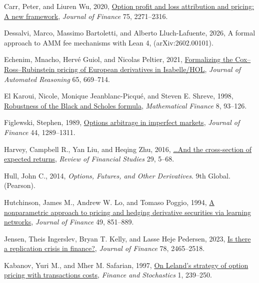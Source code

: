 \documentclass[
  11pt,
  letterpaper,
  DIV=12,
  numbers=noendperiod]{scrartcl}
\newlength{\cslhangindent}
\newenvironment{CSLReferences}[2] %
 {\begin{list}{}{%
  \setlength{\itemindent}{0pt}
  \setlength{\leftmargin}{0pt}
  \setlength{\parsep}{0pt}
  \ifodd #1
   \setlength{\leftmargin}{\cslhangindent}
   \setlength{\itemindent}{-1\cslhangindent}
  \fi
  \setlength{\itemsep}{#2\baselineskip}}}
 {\end{list}}
\numberwithin{equation}{section}
\numberwithin{figure}{section}
\numberwithin{table}{section}
\begin{document}
\begin{CSLReferences}{0}{1}
Carr, Peter, and Liuren Wu, 2020,
\href{https://doi.org/10.1111/jofi.12894}{Option profit and loss
attribution and pricing: A new framework}, \emph{Journal of Finance} 75,
2271--2316.

Dessalvi, Marco, Massimo Bartoletti, and Alberto Lluch-Lafuente, 2026, A
formal approach to {AMM} fee mechanisms with {Lean} 4,
(arXiv:2602.00101).

Echenim, Mnacho, Hervé Guiol, and Nicolas Peltier, 2021,
\href{https://doi.org/10.1007/s10817-019-09528-w}{Formalizing the
{Cox--Ross--Rubinstein} pricing of {European} derivatives in
{Isabelle/HOL}}, \emph{Journal of Automated Reasoning} 65, 669--714.

El Karoui, Nicole, Monique Jeanblanc-Picqué, and Steven E. Shreve, 1998,
\href{https://doi.org/10.1111/1467-9965.00047}{Robustness of the {B}lack
and {S}choles formula}, \emph{Mathematical Finance} 8, 93--126.

Figlewski, Stephen, 1989,
\href{https://doi.org/10.1111/j.1540-6261.1989.tb02649.x}{Options
arbitrage in imperfect markets}, \emph{Journal of Finance} 44,
1289--1311.

Harvey, Campbell R., Yan Liu, and Heqing Zhu, 2016,
\href{https://doi.org/10.1093/rfs/hhv059}{\ldots And the cross-section
of expected returns}, \emph{Review of Financial Studies} 29, 5--68.

Hull, John C., 2014, \emph{Options, Futures, and Other Derivatives}. 9th
Global. (Pearson).

Hutchinson, James M., Andrew W. Lo, and Tomaso Poggio, 1994,
\href{https://doi.org/10.1111/j.1540-6261.1994.tb00081.x}{A
nonparametric approach to pricing and hedging derivative securities via
learning networks}, \emph{Journal of Finance} 49, 851--889.

Jensen, Theis Ingerslev, Bryan T. Kelly, and Lasse Heje Pedersen, 2023,
\href{https://doi.org/10.1111/jofi.13249}{Is there a replication crisis
in finance?}, \emph{Journal of Finance} 78, 2465--2518.

Kabanov, Yuri M., and Mher M. Safarian, 1997,
\href{https://doi.org/10.1007/s007800050023}{On {Leland}'s strategy of
option pricing with transactions costs}, \emph{Finance and Stochastics}
1, 239--250.


\end{CSLReferences}
\end{document}
